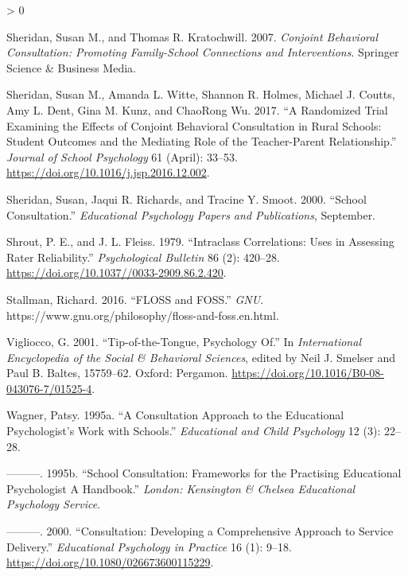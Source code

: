 \documentclass[
]{article}
\newlength{\cslhangindent}
\newenvironment{CSLReferences}[2] %
 {%
  \setlength{\parindent}{0pt}
  \ifodd #1 \everypar{\setlength{\hangindent}{\cslhangindent}}\ignorespaces\fi
  \ifnum #2 > 0
  \setlength{\parskip}{#2\baselineskip}
  \fi
 }%
 {}
\begin{document}
\begin{CSLReferences}{1}{0}
\leavevmode\hypertarget{ref-sheridanConjointBehavioralConsultation2007}{}%
Sheridan, Susan M., and Thomas R. Kratochwill. 2007. \emph{Conjoint
{Behavioral Consultation}: {Promoting Family}-{School Connections} and
{Interventions}}. {Springer Science \& Business Media}.

\leavevmode\hypertarget{ref-sheridanRandomizedTrialExamining2017}{}%
Sheridan, Susan M., Amanda L. Witte, Shannon R. Holmes, Michael J.
Coutts, Amy L. Dent, Gina M. Kunz, and ChaoRong Wu. 2017. {``A
Randomized Trial Examining the Effects of {Conjoint Behavioral
Consultation} in Rural Schools: {Student} Outcomes and the Mediating
Role of the Teacher-Parent Relationship.''} \emph{Journal of School
Psychology} 61 (April): 33--53.
\url{https://doi.org/10.1016/j.jsp.2016.12.002}.

\leavevmode\hypertarget{ref-sheridanSchoolConsultation2000}{}%
Sheridan, Susan, Jaqui R. Richards, and Tracine Y. Smoot. 2000.
{``School {Consultation}.''} \emph{Educational Psychology Papers and
Publications}, September.

\leavevmode\hypertarget{ref-shroutIntraclassCorrelationsUses1979}{}%
Shrout, P. E., and J. L. Fleiss. 1979. {``Intraclass Correlations: Uses
in Assessing Rater Reliability.''} \emph{Psychological Bulletin} 86 (2):
420--28. \url{https://doi.org/10.1037//0033-2909.86.2.420}.

\leavevmode\hypertarget{ref-stallmanFLOSSFOSS2016}{}%
Stallman, Richard. 2016. {``{FLOSS} and {FOSS}.''} \emph{GNU}.
https://www.gnu.org/philosophy/floss-and-foss.en.html.

\leavevmode\hypertarget{ref-viglioccoTipofthetonguePsychology2001}{}%
Vigliocco, G. 2001. {``Tip-of-the-Tongue, {Psychology} Of.''} In
\emph{International {Encyclopedia} of the {Social} \& {Behavioral
Sciences}}, edited by Neil J. Smelser and Paul B. Baltes, 15759--62.
{Oxford}: {Pergamon}.
\url{https://doi.org/10.1016/B0-08-043076-7/01525-4}.

\leavevmode\hypertarget{ref-wagnerConsultationApproachEducational1995}{}%
Wagner, Patsy. 1995a. {``A Consultation Approach to the Educational
Psychologist's Work with Schools.''} \emph{Educational and Child
Psychology} 12 (3): 22--28.

\leavevmode\hypertarget{ref-wagnerSchoolConsultationFrameworks1995}{}%
---------. 1995b. {``School {Consultation}: Frameworks for the
Practising {Educational Psychologist A} Handbook.''} \emph{London:
Kensington \& Chelsea Educational Psychology Service}.

\leavevmode\hypertarget{ref-wagnerConsultationDevelopingComprehensive2000}{}%
---------. 2000. {``Consultation: {Developing} a Comprehensive Approach
to Service Delivery.''} \emph{Educational Psychology in Practice} 16
(1): 9--18. \url{https://doi.org/10.1080/026673600115229}.


\end{CSLReferences}
\end{document}
